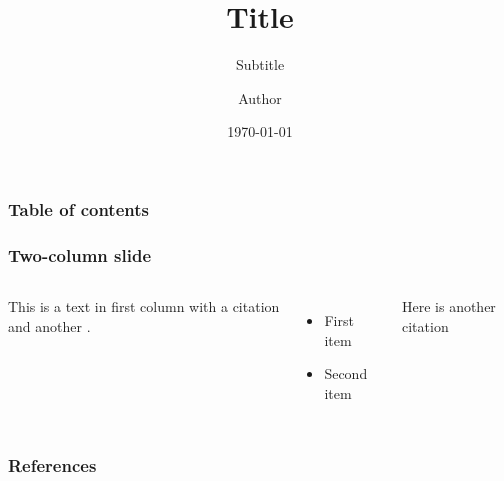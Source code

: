\message{ !name(beamerTemplate.tex)}\documentclass{beamer}
\title[Title]{Title}
\subtitle{Subtitle}
\author[Author]{Author}
\institute{Institution}
\date{\today}
\begin{document}


\frame{\titlepage}

\begin{frame}
	\frametitle{Table of contents}
	\tableofcontents
\end{frame}

\begin{frame}
\frametitle{Two-column slide}
\begin{columns}
	
	This is a text in first column with a citation \citet{einstein} and another \citep{dirac}.
	\begin{itemize}
		\item First item
		\item Second item
	\end{itemize}
	
	Here is another citation \citep{knuthwebsite}
\end{columns}
\end{frame}
\begin{frame}
  \frametitle{References}
  
  
\end{frame}
\end{document}
